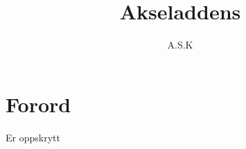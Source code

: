 \documentclass[norsk,10pt,twoside]{book}
\author{A.S.K}
\title{Akseladdens}
\date{}
\begin{document}
\pagestyle{empty} %
\chapter*{Forord}
Er oppskrytt








\end{document}
